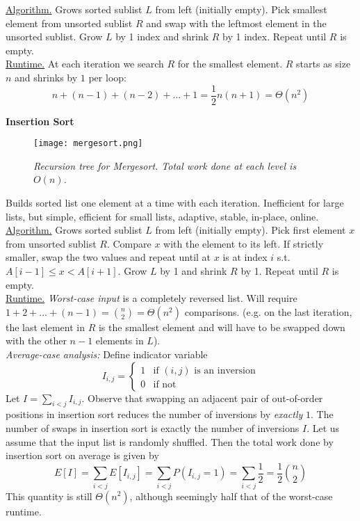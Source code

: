 \documentclass[12pt, fleqn]{general}
\begin{document}
\begin{multicols*}{2}
    \underline{Algorithm.} Grows sorted sublist $L$ from left (initially empty). Pick smallest element from unsorted sublist $R$ and swap with the leftmost element in the unsorted sublist. Grow $L$ by 1 index and shrink $R$ by 1 index. Repeat until $R$ is empty.\\

    \underline{Runtime.} At each iteration we search $R$ for the smallest element. $R$ starts as size $n$ and shrinks by $1$ per loop: $$n + (n-1) + (n-2) + ... + 1 = \frac{1}{2} n(n+1) = \Theta(n^2)$$

    \textbf{Insertion Sort}\\

    \begin{figure*}[t]
        \centering
        \texttt{[image: mergesort.png]}
        \caption*{\emph{Recursion tree for Mergesort. Total work done at each level is $O(n)$.}}
    \end{figure*}

    Builds sorted list one element at a time with each iteration. Inefficient for large lists, but simple, efficient for small lists, adaptive, stable, in-place, online.\\

    \underline{Algorithm.} Grows sorted sublist $L$ from left (initially empty). Pick first element $x$ from unsorted sublist $R$. Compare $x$ with the element to its left. If strictly smaller, swap the two values and repeat until at $x$ is at index $i$ s.t. $A[i-1] \leq x < A[i+1]$. Grow $L$ by 1 and shrink $R$ by 1. Repeat until $R$ is empty.\\

    \underline{Runtime.} \emph{Worst-case input} is a completely reversed list. Will require $1 + 2 + ... + (n-1) = {n \choose 2} = \Theta(n^2)$ comparisons. (e.g. on the last iteration, the last element in $R$ is the smallest element and will have to be swapped down with the other $n-1$ elements in $L$).\\
    
    \emph{Average-case analysis:} Define indicator variable $$I_{i,j} = \begin{cases} 1 & \text{if $(i,j)$ is an inversion}\\ 0 &\text{if not}\end{cases}$$ Let $I = \sum_{i < j} I_{i,j}$. Observe that swapping an adjacent pair of out-of-order positions in insertion sort reduces the number of inversions by \emph{exactly} $1$. The number of swaps in insertion sort is exactly the number of inversions $I$. Let us assume that the input list is randomly shuffled. 
    Then the total work done by insertion sort on average is given by $$E[I] = \sum_{i < j} E[I_{i,j}] = \sum_{i < j} P(I_{i,j} = 1) = \sum_{i < j} \frac{1}{2} = \frac{1}{2}{n \choose 2}$$ This quantity is still $\Theta(n^2)$, although seemingly half that of the worst-case runtime.\\


\end{multicols*}
\end{document}

